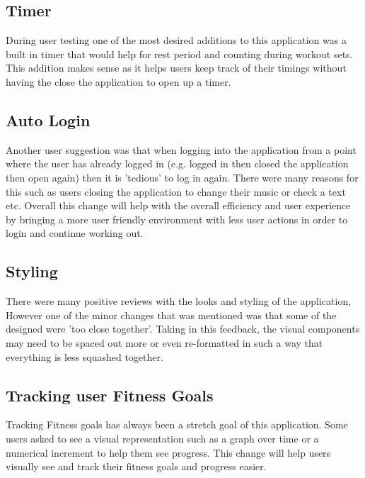 \documentclass[12pt, titlepage]{article}
\begin{document}
\subsection{Timer}
During user testing one of the most desired additions to this application was a built in timer that would help for rest period and counting during workout sets. This addition makes sense as it helps users keep track of their timings without having the close the application to open up a timer. 
\subsection{Auto Login}
Another user suggestion was that when logging into the application from a point where the user has already logged in (e.g. logged in then closed the application then open again) then it is 'tedious' to log in again. There were many reasons for this such as users closing the application to change their music or check a text etc. Overall this change will help with the overall efficiency and user experience by bringing a more user friendly environment with less user actions in order to login and continue working out.
\subsection{Styling}
There were many positive reviews with the looks and styling of the application, However one of the minor changes that was mentioned was that some of the designed were 'too close together'. Taking in this feedback, the visual components may need to be spaced out more or even re-formatted in such a way that everything is less squashed together.
\subsection{Tracking user Fitness Goals}
Tracking Fitness goals  has always been a stretch goal of this application. Some users asked to see a visual representation such as a graph over time or a numerical increment to help them see progress. This change will help users visually see and track their fitness goals and progress easier.
\end{document}
